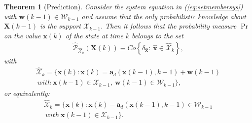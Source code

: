 \documentclass[twocolumn]{autart}
\newtheorem{theorem}{Theorem}
\begin{document}
\begin{theorem}[Prediction]
\label{Th:prediction}
Consider the system equation in (\ref{eq:setmembersys}) with $\mathbf{w}(k-1) \in \mathcal{W}_{k-1}$ and assume
 that the only  probabilistic knowledge about $\mathbf{X}(k-1)$ is the support $\mathcal{X}_{k-1}$.
 Then it follows that the probability measure $\Pr$ on the value $\mathbf{x}(k)$ of the state at time $k$ belongs to the set
 \begin{equation}
\label{eq:probconstr}
\begin{array}{l}
\hat{\mathcal{P}}_{{\hat{\mathcal{X}}_k}}(\mathbf{X}(k))\equiv Co\left\{\delta_{\hat{\mathbf{x}}}:~\hat{\mathbf{x}}\in  {\hat{\mathcal{X}}_k}\right\}, %
 \end{array}
\end{equation}
with
 \begin{align}
\nonumber
{\hat{\mathcal{X}}_k}=\Big\{\mathbf{x}(k): \mathbf{x}(k)=\mathbf{a}_d(\mathbf{x}(k-1),k-1)+\mathbf{w}(k-1)\\
\label{eq:predictionv}
~with~ \mathbf{x}(k-1) \in \mathcal{X}_{k-1}, ~\mathbf{w}(k-1) \in \mathcal{W}_{k-1}\Big\},
\end{align}
or equivalently:
 \begin{align}
\nonumber
{\hat{\mathcal{X}}_k}=\Big\{\mathbf{x}(k): \mathbf{x}(k)-\mathbf{a}_d(\mathbf{x}(k-1),k-1) \in \mathcal{W}_{k-1} \\
\label{eq:predictionv2}
~with~ \mathbf{x}(k-1) \in \mathcal{X}_{k-1}\Big\}.
\end{align}
\end{theorem}
\end{document}

